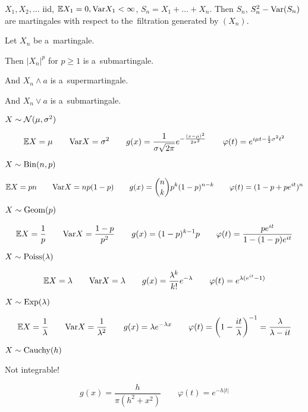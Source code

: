 	\begin{proposition}[8.5]
		$X_1, X_2, \ldots$ iid, $\mathbb{E} X_1 = 0, \mathrm{Var} X_1 < \infty$,
		$S_n = X_1 + \ldots + X_n$.
		Then $S_n$, $S_n^2 - \mathrm{Var}(S_n)$ are martingales with respect
		to the~filtration generated by $(X_n)$.
	\end{proposition}
	
	\begin{proposition}[9.1]
		Let $X_n$ be a~martingale.
		
		Then $|X_n|^p$ for $p \geq 1$ is a~submartingale.
		
		And $X_n \wedge a$ is a~supermartingale.
		
		And $X_n \vee a$ is a~submartingale.
	\end{proposition}

	
	\begin{proposition}
		$X \sim \mathcal{N}(\mu, \sigma^2)$
		
		$$\mathbb{E} X = \mu 
		\qquad \mathrm{Var} X = \sigma^2 
		\qquad g(x) = \frac{1}{\sigma \sqrt{2 \pi}} e^{- \frac{(x-\mu)^2}{2 \sigma^2}} 
		\qquad \varphi(t) = e^{i\mu t - \frac{1}{2} \sigma^2 t^2}$$
	\end{proposition}
	
	\begin{proposition}
		$X \sim {\mathrm{Bin}}(n,p)$
		
		$$\mathbb{E} X = pn
		\qquad \mathrm{Var} X = np(1-p)
		\qquad g(x) = \binom{n}{k} p^k (1-p)^{n-k}
		\qquad \varphi(t) = (1-p+pe^{it})^n$$
	\end{proposition}

	
	\begin{proposition}
		$X \sim {\mathrm{Geom}}(p)$
		
		$$\mathbb{E} X = \frac{1}{p}
		\qquad \mathrm{Var} X = \frac{1-p}{p^2}
		\qquad g(x) = (1-p)^{k-1} p
		\qquad \varphi(t) = \frac{p e^{it}}{1 - (1-p) e^{it}}$$
	\end{proposition}
	
	\begin{proposition}
		$X \sim {\mathrm{Poiss}}(\lambda)$
		
		$$\mathbb{E} X = \lambda
		\qquad \mathrm{Var} X = \lambda
		\qquad g(x) = \frac{\lambda^k}{k!} e^{-\lambda}
		\qquad \varphi(t) = e^{\lambda (e^{it} - 1)}$$
	\end{proposition}
	
	\begin{proposition}
		$X \sim {\mathrm{Exp}}(\lambda)$
		
		$$\mathbb{E} X = \frac{1}{\lambda}
		\qquad \mathrm{Var} X = \frac{1}{\lambda^2}
		\qquad g(x) = \lambda e^{-\lambda x}
		\qquad \varphi(t) = \left(1 - \frac{it}{\lambda}\right)^{-1} = \frac{\lambda}{\lambda - it}$$
	\end{proposition}
	
	\begin{proposition}
		$X \sim {\mathrm{Cauchy}}(h)$
		
		Not integrable!
		
		$$g(x) = \frac{h}{\pi(h^2 + x^2)}
		\qquad \varphi(t) = e^{-h|t|}$$
	\end{proposition}






 
 

